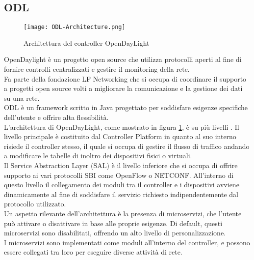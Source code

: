 \subsection{ODL}
\begin{figure}[h]
    \centering
   \texttt{[image: ODL-Architecture.png]}
    \caption{Architettura del controller OpenDayLight \cite{archodl}}
    \label{fig:ArchODL}
\end{figure}
OpenDaylight\cite{ODL} è un progetto open source che utilizza protocolli aperti al fine di fornire controlli centralizzati e gestire il monitoring della rete.
\\Fa parte della fondazione LF Networking \cite{LFN} che si occupa di coordinare il supporto a progetti open source volti a migliorare la comunicazione e la gestione dei dati su una rete.
\\ODL è un framework scritto in Java progettato per soddisfare esigenze specifiche dell'utente e offrire alta flessibilità. 
\\L'architettura di OpenDayLight, come mostrato in figura \ref{fig:ArchODL}, è su più livelli \cite{tesiodl}. 
Il livello principale è costituito dal Controller Platform in quanto al suo interno risiede il controller stesso, il quale si 
occupa di gestire il flusso di traffico andando a modificare le tabelle di inoltro dei dispositivi fisici o virtuali. 
\\Il Service Abstraction Layer (SAL) è il livello inferiore che si occupa di offrire supporto ai vari protocolli SBI come OpenFlow o NETCONF. 
All'interno di questo livello il collegamento dei moduli tra il controller e i dispositivi avviene dinamicamente al fine di soddisfare il servizio richiesto indipendentemente dal protocollo utilizzato.
\\Un aspetto rilevante dell'architettura è la presenza di microservizi, che l'utente può attivare o disattivare in base alle proprie esigenze.
Di default, questi microservizi sono disabilitati, offrendo un alto livello di personalizzazione.
\\I microservizi sono implementati come moduli all'interno del controller, e possono essere collegati tra loro per eseguire diverse attività di rete. 
